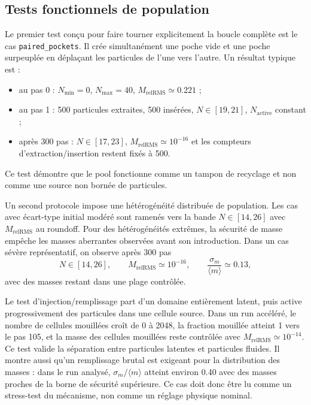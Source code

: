 \documentclass[11pt,a4paper]{article}
\begin{document}
\subsection{Tests fonctionnels de population}

Le premier test conçu pour faire tourner explicitement la boucle complète est le cas \texttt{paired\_pockets}. Il crée simultanément une poche vide et une poche surpeuplée en déplaçant les particules de l'une vers l'autre. Un résultat typique est :
\begin{itemize}
  \item au pas 0 : $N_{\min}=0$, $N_{\max}=40$, $M_{\mathrm{relRMS}}\simeq 0.221$ ;
  \item au pas 1 : 500 particules extraites, 500 insérées, $N\in[19,21]$, $N_{\mathrm{active}}$ constant ;
  \item après 300 pas : $N\in[17,23]$, $M_{\mathrm{relRMS}}\simeq 10^{-16}$ et les compteurs d'extraction/insertion restent fixés à 500.
\end{itemize}
Ce test démontre que le pool fonctionne comme un tampon de recyclage et non comme une source non bornée de particules.

Un second protocole impose une hétérogénéité distribuée de population. Les cas avec écart-type initial modéré sont ramenés vers la bande $N\in[14,26]$ avec $M_{\mathrm{relRMS}}$ au roundoff. Pour des hétérogénéités extrêmes, la sécurité de masse empêche les masses aberrantes observées avant son introduction. Dans un cas sévère représentatif, on observe après 300 pas
\begin{equation}
  N\in[14,26],
  \qquad
  M_{\mathrm{relRMS}}\simeq 10^{-16},
  \qquad
  \frac{\sigma_m}{\langle m\rangle}\simeq 0.13,
\end{equation}
avec des masses restant dans une plage contrôlée.

Le test d'injection/remplissage part d'un domaine entièrement latent, puis active progressivement des particules dans une cellule source. Dans un run accéléré, le nombre de cellules mouillées croît de 0 à 2048, la fraction mouillée atteint 1 vers le pas 105, et la masse des cellules mouillées reste contrôlée avec $M_{\mathrm{relRMS}}\simeq 10^{-14}$. Ce test valide la séparation entre particules latentes et particules fluides. Il montre aussi qu'un remplissage brutal est exigeant pour la distribution des masses : dans le run analysé, $\sigma_m/\langle m\rangle$ atteint environ 0.40 avec des masses proches de la borne de sécurité supérieure. Ce cas doit donc être lu comme un stress-test du mécanisme, non comme un réglage physique nominal.
\end{document}
